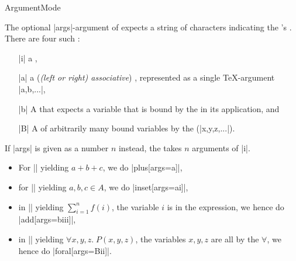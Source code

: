 \documentclass{stex}
\begin{document}
  \begin{smodule}[title=Argument Modes]{ArgumentMode}


    \begin{sparagraph}[style={defibox,symdoc},name=argument mode]
      The optional |args|-argument of  expects
      a string of characters indicating the 's
      . There are four such 
      :
      \begin{itemize}
        \item[|i|] a ,
        \item[|a|] a (\emph{(left or right) associative}) 
          , represented as a single
          \TeX-argument |{a,b,...}|,
        \item[|b|] A  that expects a variable
          that is bound by the  in its application, and
        \item[|B|] A  of arbitrarily
          many bound variables by the  (|{x,y,z,...}|).
      \end{itemize}

      If |args| is given as a number $n$ instead, the 
      takes $n$ arguments of  |i|.
    \end{sparagraph}

    \begin{sexample}[for={argument mode, simple argument,sequence argument,
      binding sequence argument}]
      \begin{itemize}
        \item For || yielding $a + b + c$, we do
          |{plus}[args=a]|,
        \item for || yielding $a,b,c\in A$, we do
          |{inset}[args=ai]|,
        \item in || yielding $\sum_{i=1}^nf(i)$,
          the variable $i$ is  in the expression,
          we hence do |{add}[args=biii]|,
        \item in || yielding $\forall x,y,z.\;P(x,y,z)$, 
        the variables $x,y,z$ are all  by the
        $\forall$, we hence do |{foral}[args=Bii]|.
      \end{itemize}
    \end{sexample}


\end{smodule}
\end{document}

